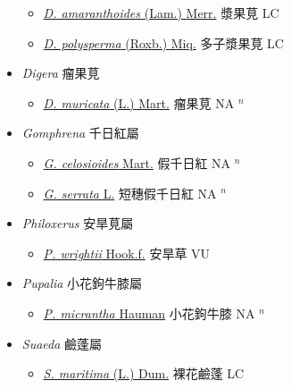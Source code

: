 \begin{itemize}
  \begin{itemize}
        \item[] \href{http://www.theplantlist.org/tpl1.1/search?q=Deeringia+amaranthoides}{\textit{D. amaranthoides} (Lam.) Merr.}   漿果莧 LC
        \item[] \href{http://www.theplantlist.org/tpl1.1/search?q=Deeringia+polysperma}{\textit{D. polysperma} (Roxb.) Miq.}   多子漿果莧 LC
  \end{itemize}
 \item[] \textit{Digera} 瘤果莧
                    
  \begin{itemize}
        \item[] \href{http://www.theplantlist.org/tpl1.1/search?q=Digera+muricata}{\textit{D. muricata} (L.) Mart.}   瘤果莧 NA $^n$
  \end{itemize}
 \item[] \textit{Gomphrena} 千日紅屬
                    
  \begin{itemize}
        \item[] \href{http://www.theplantlist.org/tpl1.1/search?q=Gomphrena+celosioides}{\textit{G. celosioides} Mart.}   假千日紅 NA $^n$
        \item[] \href{http://www.theplantlist.org/tpl1.1/search?q=Gomphrena+serrata}{\textit{G. serrata} L.}   短穗假千日紅 NA $^n$
  \end{itemize}
 \item[] \textit{Philoxerus} 安旱莧屬
                    
  \begin{itemize}
        \item[] \href{http://www.theplantlist.org/tpl1.1/search?q=Philoxerus+wrightii}{\textit{P. wrightii} Hook.f.}   安旱草 VU
  \end{itemize}
 \item[] \textit{Pupalia} 小花鉤牛膝屬
                    
  \begin{itemize}
        \item[] \href{http://www.theplantlist.org/tpl1.1/search?q=Pupalia+micrantha}{\textit{P. micrantha} Hauman}   小花鉤牛膝 NA $^n$
  \end{itemize}
 \item[] \textit{Suaeda} 鹼蓬屬
                    
  \begin{itemize}
        \item[] \href{http://www.theplantlist.org/tpl1.1/search?q=Suaeda+maritima}{\textit{S. maritima} (L.) Dum.}   裸花鹼蓬 LC
  \end{itemize}
  \end{itemize}
